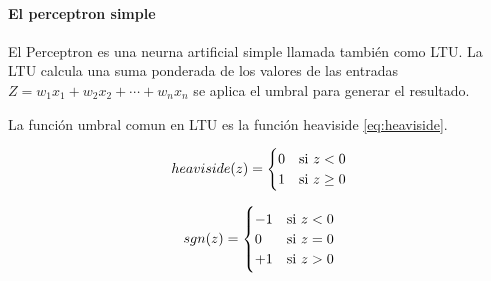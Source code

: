 
\paragraph*{El perceptron simple}

El Perceptron es una neurna artificial simple llamada también como \gls{LTU}. La \gls{LTU} calcula una suma ponderada de los valores de las entradas $Z = w_{1} x_{1} + w_{2} x_{2} + \cdots + w_{n} x_{n}$ se aplica el umbral para generar el resultado.

La función umbral comun en \gls{LTU} es la función heaviside \ref{eq:heaviside}.

\noindent\begin{minipage}{0.45\textwidth}
    \begin{equation*}
        heaviside(z) =
        \begin{cases}
            0 & \textup{si } z < 0       \\
            1 & \textup{si } z \geq{}  0
        \end{cases}
    \end{equation*}
\end{minipage}
\begin{minipage}{0.45\textwidth}
    \begin{equation}
        sgn(z) =
        \begin{cases}
            -1 & \textup{si } z < 0  \\
            0  & \textup{si } z = 0  \\
            +1 & \textup{si } z >  0
        \end{cases}
        \label{eq:heaviside}
    \end{equation}
\end{minipage}

